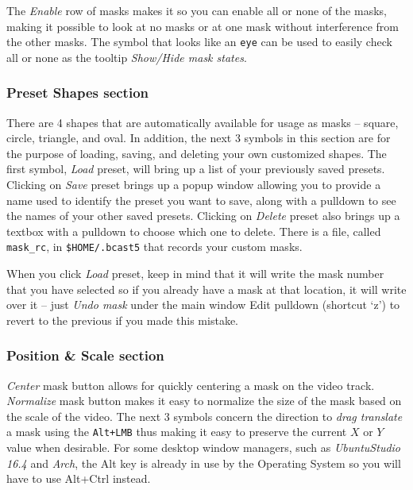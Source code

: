 The \textit{Enable} row of masks makes it so you can enable all or none of the masks, making it possible to look at no masks or at one mask without interference from the other masks. The symbol that looks like an \texttt{eye} can be used to easily check all or none as the tooltip \textit{Show/Hide mask states}.

\subsubsection*{Preset Shapes section}%
\label{ssub:preset_shape_section}

There are 4 shapes that are automatically available for usage as masks – square, circle, triangle, and oval.  In addition, the next 3 symbols in this section are for the purpose of loading, saving, and deleting your own customized shapes.  The first symbol, \textit{Load} preset, will bring up a list of your previously saved presets.  Clicking on \textit{Save} preset brings up a popup window allowing you to provide a name used to identify the preset you want to save, along with a pulldown to see the names of your other saved presets.   Clicking on \textit{Delete} preset also brings up a textbox with a pulldown to choose which one to delete.  There is a file, called \texttt{mask\_rc}, in \texttt{\$HOME/.bcast5} that records your custom masks.  

When you click \textit{Load} preset, keep in mind that it will write the mask number that you have selected so if you already have a mask at that location, it will write over it – just \textit{Undo mask} under the main window Edit pulldown (shortcut `z') to revert to the previous if you made this mistake.

\subsubsection*{Position \& Scale section}%
\label{ssub:position_scale_section}

\textit{Center} mask button allows for quickly centering a mask on the video track. 
\textit{Normalize} mask button makes it easy to normalize the size of the mask based on the scale of the video. 
The next 3 symbols concern the direction to \textit{drag translate} a mask using the \texttt{Alt+LMB} thus making it easy to preserve the current $X$ or $Y$ value when desirable.  For some desktop window managers,
such as \textit{UbuntuStudio 16.4} and \textit{Arch}, the Alt key is already in use by the Operating System
so you will have to use Alt+Ctrl instead.

